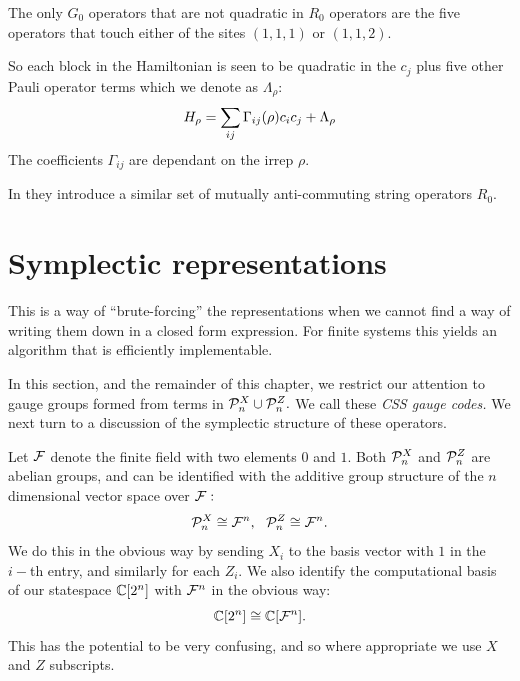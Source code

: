 The only $G_0$ operators that are not 
quadratic in $R_0$ operators are the five
operators that touch either of the sites
$(1,1,1)$ or $(1,1,2)$.

So each block in the Hamiltonian
is seen to be quadratic in the $c_j$ plus
five other Pauli operator terms which we denote as $\Lambda_\rho$:
$$
    H_\rho = \sum_{ij} \Gamma_{ij}(\rho) c_i c_j + \Lambda_\rho
$$
The coefficients $\Gamma_{ij}$ are dependant on the irrep $\rho.$

In \cite{Kells2009} they introduce a similar set of
mutually anti-commuting string operators $R_0.$

%

\def\Cn{\Complex[2^n]}
\def\Cr{\Complex[2^r]}
\def\Fn{\Field^n}
\def\Fm{\Field^m}
\def\Fr{\Field^r}
\def\Fnd{\Field_{n}}
\def\Fmd{\Field_{m}}
\def\Frd{\Field_{r}}

\def\Span#1{\langle #1 \rangle}

\section{Symplectic representations}

This is a way of ``brute-forcing'' the representations when
we cannot find a way of writing them down in a closed form expression.
For finite systems this yields an algorithm that is efficiently implementable.

In this section, and the remainder of this chapter,
we restrict our
attention to gauge groups formed from terms 
in $\mathcal{P}_n^X\cup\mathcal{P}_n^Z.$
We call these \emph{CSS gauge codes.}
We next turn to a discussion of the symplectic structure of
these operators.

Let $\mathcal{F}$ denote the finite field with two elements $0$ and $1$.
Both $\mathcal{P}^X_n$ and $\mathcal{P}^Z_n$ are abelian groups,
and can be identified with the additive 
group structure of the $n$ dimensional vector space
over $\mathcal{F}:$
$$
    \Pauli^X_n \cong \Fn,  \ \ 
    \Pauli^Z_n \cong \Fn. 
$$
We do this in the obvious way by sending $X_i$ to the basis vector with
$1$ in the $i-$th entry, and similarly for each $Z_i$. 
We also identify the computational basis of our statespace $\mathbb{C}[2^n]$
with $\Fn$ in the obvious way:
$$
\Complex[2^n] \cong \Complex[\Fn].
$$
This has the potential to be very confusing, and
so where appropriate we use $X$ and $Z$ subscripts.

